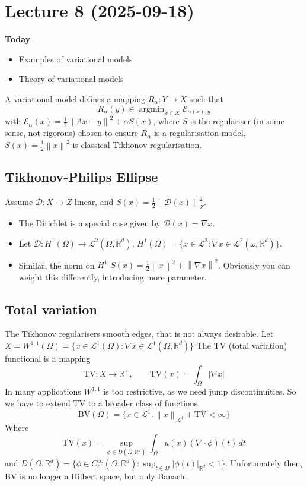 \documentclass[12pt]{article}
\theoremstyle{definition}
\newcommand{\real}{\mathbb{R}}   %
\newcommand{\abs}[1]{\left|#1\right|}
\DeclareMathOperator{\argmin}{argmin}
\newcommand\norm[1]{\left\lVert#1\right\rVert}
\begin{document}
\newpage
\section{Lecture 8 (2025-09-18)}

\textbf{Today}
\begin{itemize}
    \item Examples of variational models
    \item Theory of variational models
\end{itemize}
A variational model defines a mapping $R_\alpha:Y\to X$ such that 
\begin{equation*}
    R_\alpha(y) \in \argmin_{x\in X} \mathcal{E}_{\alpha(x),y}
\end{equation*}
with $\mathcal{E}_\alpha(x) = \frac{1}{2}\norm{Ax-y}^2 +\alpha S(x)$, where $S$ is the regulariser (in some sense, not rigorous) chosen to ensure $R_\alpha$ is a regularisation model, $S(x)=\frac{1}{2}\norm{x}^2$ is classical Tikhonov regularisation.

\subsection{Tikhonov-Philips Ellipse}
Assume $\mathscr{D}:X\to Z$ linear, and $S(x) = \frac{1}{2}\norm{\mathscr{D}(x)}_Z^2$. 
\begin{itemize}
    \item The Dirichlet is a special case given by $\mathscr{D}(x) = \nabla x$.
    \item Let $\mathscr{D}:H^1(\Omega) \to \mathcal{L}^2(\Omega, \real^d)$, $H^1(\Omega) = \{x\in \mathcal{L}^2:\nabla x\in \mathcal{L}^2(\omega,\real^d)\}$.
    \item Similar, the norm on $H^1$ $S(x) = \frac{1}{2} \norm{x}^2+\norm{\nabla x}^2$. Obviously you can weight this differently, introducing more parameter.
\end{itemize}

\subsection{Total variation}
The Tikhonov regularisers smooth edges, that is not always desirable. Let $X=W^{1,1}(\Omega) = \{x\in\mathcal{L}^1(\Omega): \nabla x\in\mathcal{L}^1(\Omega,\real^d)\}$ The TV (total variation) functional is a mapping
\begin{equation*}
    \text{TV}:X\to\real^+, \qquad \text{TV}(x) = \int_\Omega \abs{\nabla x}
\end{equation*} 
In many applications $W^{1,1}$ is too restrictive, as we need jump discontinuities. So we have to extend TV to a broader class of functions.
\begin{equation*}
    \text{BV}(\Omega)= \{x\in \mathcal{L}^1:\norm{x}_{\mathcal{L}^1}+\text{TV} <\infty\}
\end{equation*}
Where 
\begin{equation*}
    \text{TV}(x) = \sup_{\phi\in D(\Omega,\real^d)}\int_\Omega u(x) (\nabla\cdot \phi)(t)\,dt
\end{equation*}
and $D(\Omega,\real^d) = \{\phi\in C_c^\infty(\Omega, \real^d) : \sup_{t\in\Omega} \abs{\phi(t)}_{\real^d}<1\}$. Unfortunately then, BV is no longer a Hilbert space, but only Banach. 
\end{document}
